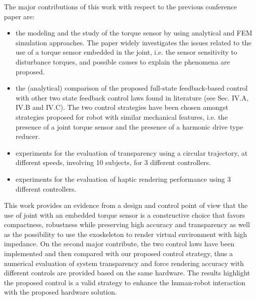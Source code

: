 \begin{reply}

The major contributions of this work with respect to the previous conference paper are:
\begin{itemize}
	\item  the modeling and the study of the torque sensor by using analytical and FEM simulation approaches. The paper widely investigates the issues related to the use of a torque sensor embedded in the joint, i.e. the sensor sensitivity to disturbance torques, and possible causes to explain the phenomena are proposed.
	\item the (analytical) comparison of the proposed full-state feedback-based control with other two state feedback control laws found in literature (see Sec. IV.A, IV.B and IV.C). The two control strategies have been chosen amongst strategies proposed for robot with similar mechanical features, i.e. the presence of a joint torque sensor and the presence of a harmonic drive type reducer. 
	\item experiments for the evaluation of transparency using a circular trajectory, at different speeds, involving 10 subjects, for 3 different controllers.
	\item experiments for the evaluation of haptic rendering performance using 3 different controllers.
\end{itemize}

This work provides an evidence from a design and control point of view that the use of joint with an embedded torque sensor is a constructive choice that favors compactness, robustness while preserving high accuracy and transparency as well as the possibility to use the exoskeleton to render virtual environment with high impedance.  
On the second major contribute, the two control laws have been implemented and then compared with our proposed control strategy, thus a numerical evaluation of system transparency and force rendering accuracy with different controls are provided based on the same hardware.
The results highlight the proposed control is a valid strategy to enhance the human-robot interaction with the proposed hardware solution.

		
\end{reply}



